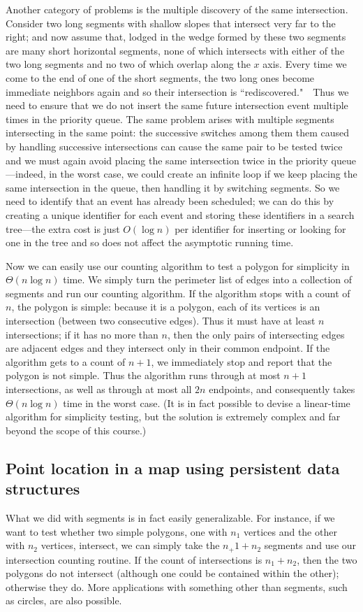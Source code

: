 \documentclass[11pt]{article}
\begin{document}
Another category of problems is the multiple discovery of the same
intersection. Consider two long segments with shallow slopes that intersect
very far to the right; and now assume that, lodged in the wedge formed
by these two segments are many short horizontal segments, none of which
intersects with either of the two long segments and no two of which
overlap along the $x$ axis.  Every time we come to the end of one of the
short segments, the two long ones become immediate neighbors again and so
their intersection is ``rediscovered."\ \ Thus we need to ensure that we do
not insert the same future intersection event multiple times in the priority
queue.   The same problem arises with multiple segments intersecting in
the same point: the successive switches among them them caused by handling
successive intersections can cause the same pair to be tested twice and
we must again avoid placing the same intersection twice in the priority queue---indeed, in the worst case, we could create an infinite loop if we keep placing
the same intersection in the queue, then handling it by switching segments.
So we need to identify that an event has already been scheduled; we can do this
by creating a unique identifier for each event and storing these identifiers
in a search tree---the extra cost is just $O(\log n)$ per identifier for
inserting or looking for one in the tree and so does not affect the asymptotic
running time.

Now we can easily use our counting algorithm to test a polygon for simplicity
in $\Theta(n\log n)$ time.  We simply turn the perimeter list of edges into
a collection of segments and run our counting algorithm.  If the algorithm
stops with a count of $n$, the polygon is simple: because it is a polygon,
each of its vertices is an intersection (between two consecutive edges).
Thus it must have at least $n$ intersections; if it has no more than $n$,
then the only pairs of intersecting edges are adjacent edges and they
intersect only in their common endpoint.  If the algorithm gets to a count
of $n+1$, we immediately stop and report that the polygon is not simple.
Thus the algorithm runs through at most $n+1$ intersections, as well as through
at most all $2n$ endpoints, and consequently takes $\Theta(n\log n)$ time
in the worst case.  (It is in fact possible to devise a linear-time algorithm
for simplicity testing, but the solution is extremely complex and far beyond
the scope of this course.)

\subsection{Point location in a map using persistent data structures}
What we did with segments is in fact easily generalizable.  For instance,
if we want to test whether two simple polygons, one with $n_1$ vertices and the
other with $n_2$ vertices, intersect, we can simply take the $n_+1+n_2$
segments and use our intersection counting routine.  If the count of
intersections is $n_1+n_2$, then the two polygons do not intersect (although
one could be contained within the other); otherwise they do.  More applications
with something other than segments, such as circles, are also possible.
\end{document}

